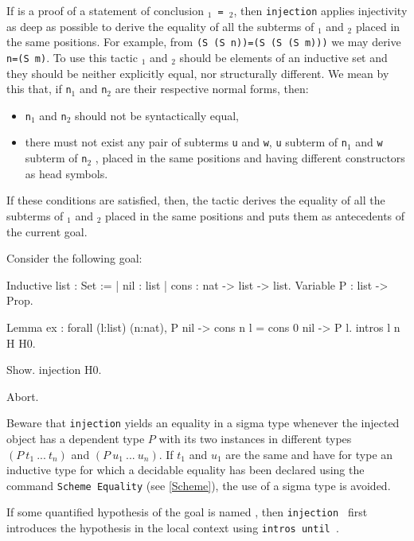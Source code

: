 If {\term} is a proof of a statement of conclusion
 {\tt {\term$_1$} = {\term$_2$}},
then {\tt injection} applies injectivity as deep as possible to
derive the equality of all the subterms of {\term$_1$} and {\term$_2$}
placed in the same positions. For example, from {\tt (S
  (S n))=(S (S (S m)))} we may derive {\tt n=(S m)}.  To use this
tactic {\term$_1$} and {\term$_2$} should be elements of an inductive
set and they should be neither explicitly equal, nor structurally
different. We mean by this that, if {\tt n$_1$} and {\tt n$_2$} are
their respective normal forms, then:
\begin{itemize}
\item {\tt n$_1$} and {\tt n$_2$} should not be syntactically equal,
\item there must not exist any pair of subterms {\tt u} and {\tt w},
  {\tt u} subterm of {\tt n$_1$} and {\tt w} subterm of {\tt n$_2$} ,
  placed in the same positions and having different constructors as
  head symbols.
\end{itemize}
If these conditions are satisfied, then, the tactic derives the
equality of all the subterms of {\term$_1$} and {\term$_2$} placed in
the same positions and puts them as antecedents of the current goal.

\Example Consider the following goal:

\begin{coq_example*}
Inductive list : Set :=
  | nil : list
  | cons : nat -> list -> list.
Variable P : list -> Prop.
\end{coq_example*}
\begin{coq_eval}
Lemma ex :
 forall (l:list) (n:nat), P nil -> cons n l = cons 0 nil -> P l.
intros l n H H0.
\end{coq_eval}
\begin{coq_example}
Show.
injection H0.
\end{coq_example}
\begin{coq_eval}
Abort.
\end{coq_eval}

Beware that \texttt{injection} yields an equality in a sigma type
whenever the injected object has a dependent type $P$ with its two
instances in different types $(P~t_1~...~t_n)$ and
$(P~u_1~...~u_n)$. If $t_1$ and $u_1$ are the same and have for type
an inductive type for which a decidable equality has been declared
using the command {\tt Scheme Equality} (see \ref{Scheme}), the use of
a sigma type is avoided.

\Rem If some quantified hypothesis of the goal is named {\ident}, then
{\tt injection {\ident}} first introduces the hypothesis in the local
context using \texttt{intros until \ident}.

